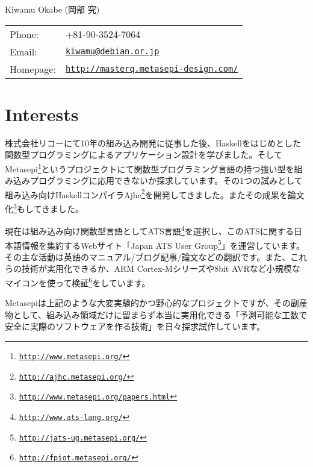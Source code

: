 \documentclass[letterpaper]{article}
\def\name{Kiwamu Okabe (岡部 究)}
\begin{document}
{\huge \name}


\vspace{0.25in}

\begin{minipage}{0.3\linewidth}
  \begin{tabular}{ll}
    Phone: & +81-90-3524-7064 \\
    Email: & \href{mailto:kiwamu@debian.or.jp}{\tt kiwamu@debian.or.jp} \\
    Homepage: & \href{http://masterq.metasepi-design.com/}{\tt http://masterq.metasepi-design.com/} \\
  \end{tabular}
\end{minipage}

\section*{Interests}

株式会社リコーにて10年の組み込み開発に従事した後、Haskellをはじめとした関数型プログラミングによるアプリケーション設計を学びました。そしてMetasepi\footnote{\href{http://www.metasepi.org/}{\tt http://www.metasepi.org/}}というプロジェクトにて関数型プログラミング言語の持つ強い型を組み込みプログラミングに応用できないか探求しています。その1つの試みとして組み込み向けHaskellコンパイラAjhc\footnote{\href{http://ajhc.metasepi.org/}{\tt http://ajhc.metasepi.org/}}を開発してきました。またその成果を論文化\footnote{\href{http://www.metasepi.org/papers.html}{\tt http://www.metasepi.org/papers.html}}もしてきました。

現在は組み込み向け関数型言語としてATS言語\footnote{\href{http://www.ats-lang.org/}{\tt http://www.ats-lang.org/}}を選択し、このATSに関する日本語情報を集約するWebサイト「Japan ATS User Group\footnote{\href{http://jats-ug.metasepi.org/}{\tt http://jats-ug.metasepi.org/}}」を運営しています。その主な活動は英語のマニュアル/ブログ記事/論文などの翻訳です。また、これらの技術が実用化できるか、ARM Cortex-Mシリーズや8bit AVRなど小規模なマイコンを使って検証\footnote{\href{http://fpiot.metasepi.org/}{\tt http://fpiot.metasepi.org/}}をしています。

Metasepiは上記のような大変実験的かつ野心的なプロジェクトですが、その副産物として、組み込み領域だけに留まらず本当に実用化できる「予測可能な工数で安全に実際のソフトウェアを作る技術」を日々探求試作しています。
\end{document}
